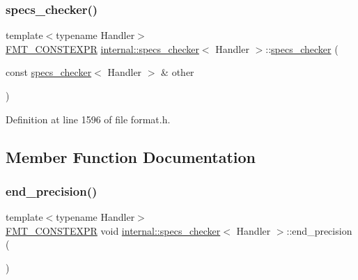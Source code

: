 \subsubsection{\texorpdfstring{specs\+\_\+checker()}{specs\_checker()}\hspace{0.1cm}{\footnotesize\ttfamily [2/2]}}
{\footnotesize\ttfamily template$<$typename Handler$>$ \\
\hyperlink{core_8h_a69201cb276383873487bf68b4ef8b4cd}{F\+M\+T\+\_\+\+C\+O\+N\+S\+T\+E\+X\+PR} \hyperlink{classinternal_1_1specs__checker}{internal\+::specs\+\_\+checker}$<$ Handler $>$\+::\hyperlink{classinternal_1_1specs__checker}{specs\+\_\+checker} (\begin{DoxyParamCaption}\item[{const \hyperlink{classinternal_1_1specs__checker}{specs\+\_\+checker}$<$ Handler $>$ \&}]{other }\end{DoxyParamCaption})\hspace{0.3cm}{\ttfamily [inline]}}



Definition at line 1596 of file format.\+h.



\subsection{Member Function Documentation}
\mbox{\label{classinternal_1_1specs__checker_a0c16ee4bc2e70bb2c3e736e195dcd870}} 
\subsubsection{\texorpdfstring{end\+\_\+precision()}{end\_precision()}}
{\footnotesize\ttfamily template$<$typename Handler$>$ \\
\hyperlink{core_8h_a69201cb276383873487bf68b4ef8b4cd}{F\+M\+T\+\_\+\+C\+O\+N\+S\+T\+E\+X\+PR} void \hyperlink{classinternal_1_1specs__checker}{internal\+::specs\+\_\+checker}$<$ Handler $>$\+::end\+\_\+precision (\begin{DoxyParamCaption}{ }\end{DoxyParamCaption})\hspace{0.3cm}{\ttfamily [inline]}}



